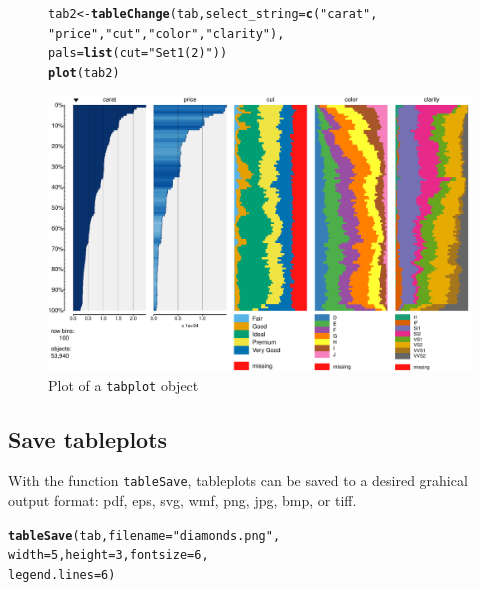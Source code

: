 \documentclass[11pt, fleqn, a4paper]{article}\usepackage[]{graphicx}\usepackage[]{color}
\makeatletter
\def\maxwidth{ %
  \ifdim\Gin@nat@width>\linewidth
    \linewidth
  \else
    \Gin@nat@width
  \fi
}
\newcommand{\hlnum}[1]{\textcolor[rgb]{0.686,0.059,0.569}{#1}}%
\newcommand{\hlstr}[1]{\textcolor[rgb]{0.192,0.494,0.8}{#1}}%
\newcommand{\hlstd}[1]{\textcolor[rgb]{0.345,0.345,0.345}{#1}}%
\newcommand{\hlkwb}[1]{\textcolor[rgb]{0.69,0.353,0.396}{#1}}%
\newcommand{\hlkwc}[1]{\textcolor[rgb]{0.333,0.667,0.333}{#1}}%
\newcommand{\hlkwd}[1]{\textcolor[rgb]{0.737,0.353,0.396}{\textbf{#1}}}%
\newenvironment{kframe}{%
 \def\at@end@of@kframe{}%
 \ifinner\ifhmode%
  \def\at@end@of@kframe{\end{minipage}}%
  \begin{minipage}{\columnwidth}%
 \fi\fi%
 \def\FrameCommand##1{\hskip\@totalleftmargin \hskip-\fboxsep
 \colorbox{shadecolor}{##1}\hskip-\fboxsep
     \hskip-\linewidth \hskip-\@totalleftmargin \hskip\columnwidth}%
 \MakeFramed {\advance\hsize-\width
   \@totalleftmargin\z@ \linewidth\hsize
   \@setminipage}}%
 {\par\unskip\endMakeFramed%
 \at@end@of@kframe}
\newenvironment{knitrout}{}{} %
\makeatother
\begin{document}
\begin{figure}[htp]
\begin{knitrout}
\color{fgcolor}\begin{kframe}
\begin{alltt}
\hlstd{tab2} \hlkwb{<-} \hlkwd{tableChange}\hlstd{(tab,} \hlkwc{select_string} \hlstd{=} \hlkwd{c}\hlstd{(}\hlstr{"carat"}\hlstd{,}
    \hlstr{"price"}\hlstd{,} \hlstr{"cut"}\hlstd{,} \hlstr{"color"}\hlstd{,} \hlstr{"clarity"}\hlstd{),}
    \hlkwc{pals} \hlstd{=} \hlkwd{list}\hlstd{(}\hlkwc{cut} \hlstd{=} \hlstr{"Set1(2)"}\hlstd{))}
\hlkwd{plot}\hlstd{(tab2)}
\end{alltt}
\end{kframe}
\includegraphics[width=\maxwidth]{figure/chunk13} 

\end{knitrout}

\caption{Plot of a {\tt tabplot} object}
\label{fig:tp7}
\end{figure}

\subsection{Save tableplots}\label{secsave}

With the function {\tt tableSave}, tableplots can be saved to a desired grahical output format: pdf, eps, svg, wmf, png, jpg, bmp, or tiff.

\begin{knitrout}
\color{fgcolor}\begin{kframe}
\begin{alltt}
\hlkwd{tableSave}\hlstd{(tab,} \hlkwc{filename} \hlstd{=} \hlstr{"diamonds.png"}\hlstd{,}
    \hlkwc{width} \hlstd{=} \hlnum{5}\hlstd{,} \hlkwc{height} \hlstd{=} \hlnum{3}\hlstd{,} \hlkwc{fontsize} \hlstd{=} \hlnum{6}\hlstd{,}
    \hlkwc{legend.lines} \hlstd{=} \hlnum{6}\hlstd{)}
\end{alltt}
\end{kframe}
\end{knitrout}
\end{document}
